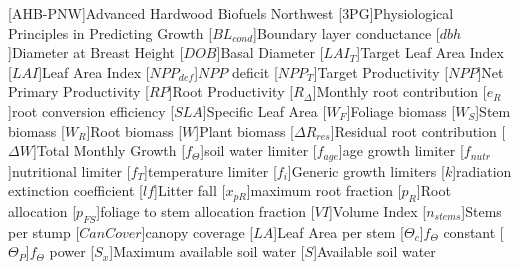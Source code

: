 \usepackage[printonlyused]{acronym}
[AHB-PNW]{Advanced Hardwood Biofuels Northwest}
[\textsc{3PG}]{Physiological Principles in Predicting Growth}
[\ensuremath{BL_{cond}}]{Boundary layer conductance}
[\ensuremath{dbh}]{Diameter at Breast Height}
[\ensuremath{DOB}]{Basal Diameter}
[\ensuremath{LAI_{T}}]{Target Leaf Area Index}
[\ensuremath{LAI}]{Leaf Area Index}
[\ensuremath{NPP_{def}}]{$NPP$ deficit}
[\ensuremath{NPP_{T}}]{Target Productivity}
[\ensuremath{NPP}]{Net Primary Productivity}
[\ensuremath{RP}]{Root Productivity}
[\ensuremath{R_{\Delta}}]{Monthly root contribution}
[\ensuremath{e_{R}}]{root conversion efficiency}
[\ensuremath{SLA}]{Specific Leaf Area}
[\ensuremath{W_F}]{Foliage biomass}
[\ensuremath{W_S}]{Stem biomass}
[\ensuremath{W_R}]{Root biomass}
[\ensuremath{W}]{Plant biomass}
[\ensuremath{\Delta R_{res}}]{Residual root contribution}
[\ensuremath{\Delta W}]{Total Monthly Growth}
[\ensuremath{f_\Theta}]{soil water limiter}
[\ensuremath{f_{age}}]{age growth limiter}
[\ensuremath{f_{nutr}}]{nutritional limiter}
[\ensuremath{f_T}]{temperature limiter}
[\ensuremath{f_i}]{Generic growth limiters}
[\ensuremath{k}]{radiation extinction coefficient}
[\ensuremath{lf}]{Litter fall}
[\ensuremath{x_{pR}}]{maximum root fraction}
[\ensuremath{p_R}]{Root allocation}
[\ensuremath{p_{FS}}]{foliage to stem allocation fraction}
[\ensuremath{VI}]{Volume Index}
[\ensuremath{n_{stems}}]{Stems per stump}
[\ensuremath{CanCover}]{canopy coverage}
[\ensuremath{LA}]{Leaf Area per stem}
[\ensuremath{\Theta_{c}}]{$f_\Theta$ constant}
[\ensuremath{\Theta_{P}}]{$f_\Theta$ power}
[\ensuremath{S_x}]{Maximum available soil water}
[\ensuremath{S}]{Available soil water}

